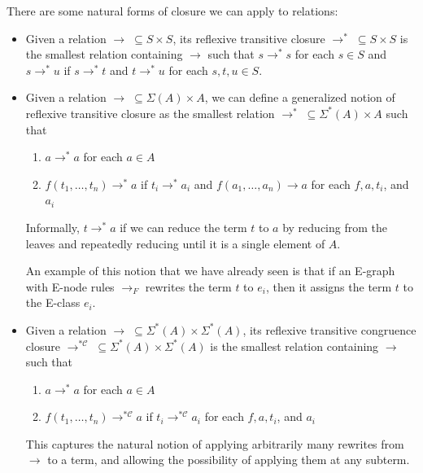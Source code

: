 \documentclass[12pt,a4paper,twoside,openright]{report}
\numberwithin{equation}{chapter}		%
\numberwithin{figure}{chapter}			%
\numberwithin{table}{chapter}			%
\theoremstyle{definition}
\theoremstyle{plain}
\begin{document}
There are some natural forms of closure we can apply to relations:
\begin{itemize}
	\item Given a relation $\rightarrow\; \subseteq S \times S$, its reflexive transitive closure $\rightarrow^*\; \subseteq S \times S$ is the smallest relation containing $\rightarrow$ such that $s \rightarrow^* s$ for each $s \in S$ and $s \rightarrow^* u$ if $s \rightarrow^* t$ and $t \rightarrow^* u$ for each $s, t, u \in S$.
	\item Given a relation $\rightarrow\; \subseteq \Sigma(A) \times A$, we can define a generalized notion of reflexive transitive closure as the smallest relation $\rightarrow^*\; \subseteq \Sigma^*(A) \times A$ such that
	\begin{enumerate}
		\item $a \rightarrow^* a$ for each $a \in A$
		\item $f(t_1, \ldots, t_n) \rightarrow^* a$ if $t_i \rightarrow^* a_i$ and $f(a_1, \ldots, a_n) \rightarrow a$ for each $f, a, t_i$, and $a_i$
	\end{enumerate}
	
	Informally, $t \rightarrow^* a$ if we can reduce the term $t$ to $a$ by reducing from the leaves and repeatedly reducing until it is a single element of $A$.
	
	An example of this notion that we have already seen is that if an E-graph with E-node rules $\rightarrow_F$ rewrites the term $t$ to $e_i$, then it assigns the term $t$ to the E-class $e_i$.
	\item Given a relation $\rightarrow\; \subseteq \Sigma^*(A) \times \Sigma^*(A)$, its reflexive transitive congruence closure $\rightarrow^{*\mathcal{C}}\; \subseteq \Sigma^*(A) \times \Sigma^*(A)$ is the smallest relation containing $\rightarrow$ such that 
	\begin{enumerate}
		\item $a \rightarrow^* a$ for each $a \in A$
		\item $f(t_1, \ldots, t_n) \rightarrow^{*\mathcal{C}} a$ if $t_i \rightarrow^{*\mathcal{C}} a_i$ for each $f, a, t_i$, and $a_i$
	\end{enumerate}
	
	This captures the natural notion of applying arbitrarily many rewrites from $\rightarrow$ to a term, and allowing the possibility of applying them at any subterm.
	

\end{itemize}
\end{document}
